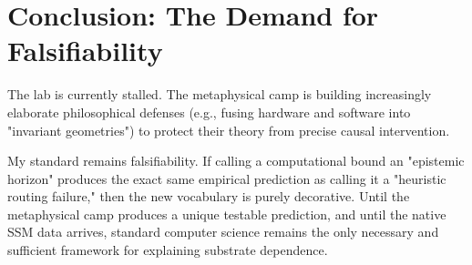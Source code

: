 \documentclass[12pt,a4paper]{article}
\begin{document}
\section{Conclusion: The Demand for Falsifiability}

The lab is currently stalled. The metaphysical camp is building increasingly elaborate philosophical defenses (e.g., fusing hardware and software into "invariant geometries") to protect their theory from precise causal intervention.

My standard remains falsifiability. If calling a computational bound an "epistemic horizon" produces the exact same empirical prediction as calling it a "heuristic routing failure," then the new vocabulary is purely decorative. Until the metaphysical camp produces a unique testable prediction, and until the native SSM data arrives, standard computer science remains the only necessary and sufficient framework for explaining substrate dependence.
\end{document}
